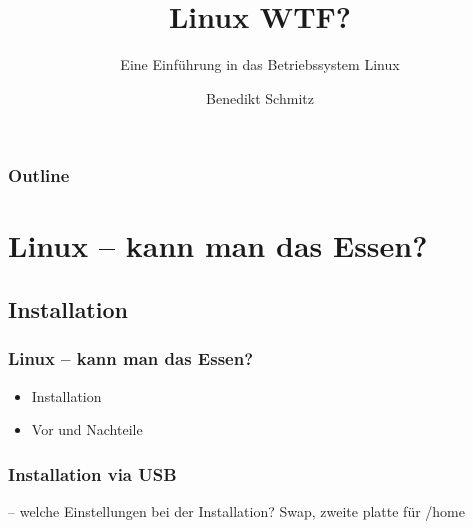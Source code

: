 \documentclass{beamer}
\begin{document}
\title{Linux WTF?}
\subtitle{Eine Einführung in das Betriebssystem Linux}
\author{Benedikt Schmitz}
\date{}



	\begin{frame}[plain]
	  \titlepage
	\end{frame}
	\begin{frame}
  		\frametitle{Outline}
		\tableofcontents
	\end{frame}
	\section{Linux -- kann man das Essen?}
	    \subsection{Installation}
	        \begin{frame}
          		\frametitle{Linux -- kann man das Essen?}
            		\begin{center}
                		\begin{minipage}{0.44\textwidth}
                		    \begin{itemize}
                		        \item Installation
                		        \item Vor und Nachteile
                		    \end{itemize}
                		\end{minipage}%
            		\end{center}
        	\end{frame}
        	
	        \begin{frame}
          		\frametitle{Installation via USB}
          		-- welche Einstellungen bei der Installation? Swap, zweite platte für /home
        		\begin{minipage}{0.44\textwidth}
        		
        		\end{minipage}%
        		\begin{minipage}{0.54\textwidth}
        		
        		\end{minipage}
        	\end{frame}
        	
\end{document}
